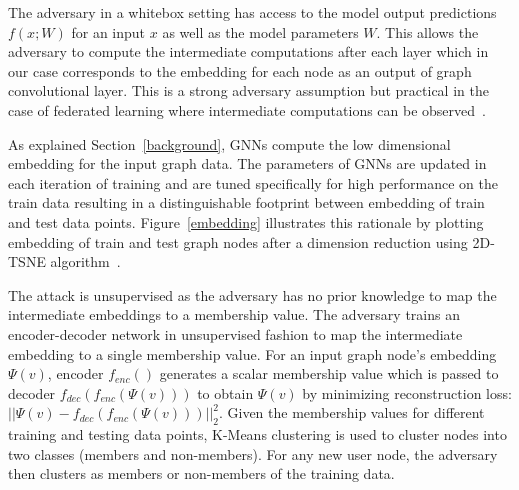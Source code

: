 The adversary in a whitebox setting has access to the model output predictions $f(x; W)$ for an input $x$ as well as the model parameters $W$.
This allows the adversary to compute the intermediate computations after each layer which in our case corresponds to the embedding for each node as an output of graph convolutional layer.
This is a strong adversary assumption but practical in the case of federated learning where intermediate computations can be observed~\cite{whitebox,collabinf}.

As explained Section~\ref{background}, GNNs compute the low dimensional embedding for the input graph data.
The parameters of GNNs are updated in each iteration of training and are tuned specifically for high performance on the train data resulting in a distinguishable footprint between embedding of train and test data points.
Figure~\ref{embedding} illustrates this rationale by plotting embedding of train and test graph nodes after a dimension reduction using 2D-TSNE algorithm~\cite{tsne}.


The attack is unsupervised as the adversary has no prior knowledge to map the intermediate embeddings to a membership value. %
The adversary trains an encoder-decoder network in unsupervised fashion to map the intermediate embedding to a single membership value.
For an input graph node's embedding $\Psi (v)$, encoder $f_{enc}()$ generates a scalar membership value which is passed to decoder $f_{dec}(f_{enc}(\Psi (v)))$ to obtain $\Psi(v)$ by minimizing reconstruction loss: $||\Psi (v) - f_{dec}(f_{enc}(\Psi (v)))||_2^2$.
Given the membership values for different training and testing data points, K-Means clustering is used to cluster nodes into two classes (members and non-members).
For any new user node, the adversary then clusters as members or non-members of the training data.







